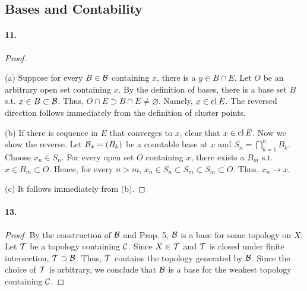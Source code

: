 \subsection{Bases and Contability}
\paragraph{11.}
\begin{proof}
  $\,$\par
  (a) Suppose for every $B\in\mathcal{B}$ containing $x$, there is a $y\in 
  B\cap E$. Let $O$ be an arbitrary open set containing $x$. By the definition
  of bases, there is a base set $B$ s.t. $x \in B \subset \mathcal{B}$. Thus,
  $O\cap E \supset B\cap E \ne \varnothing$. Namely, $x \in \operatorname{cl} E$. The
  reversed direction follows immediately from the definition of cluster points.
  
  (b) If there is sequence in $E$ that converges to $x$, clear that $x\in
  \operatorname{cl} E$. Now we show the reverse. Let $\mathcal{B}_x = (B_k)$ be a countable base
  at $x$ and $S_n = \bigcap_{k=1}^n B_k$. Choose $x_n \in S_n$. For every
  open set $O$ containing $x$, there exists a $B_m$ s.t. $x \in B_m
  \subset O$. Hence, for every $n > m$, $x_n \in S_n\subset S_m
  \subset S_m \subset O$. Thus, $x_n \to x$.
  
  (c) It follows immediately from (b).
\end{proof}

\paragraph{13.}
\begin{proof}
  By the construction of $\mathcal{B}$ and Prop. 5, $\mathcal{B}$ is a base for some
  topology on $X$. Let $\mathcal{T}$ be a topology containing $\mathcal{C}$. Since
  $X \in \mathcal{T}$ and $\mathcal{T}$ is closed under finite intersection,
  $\mathcal{T} \supset \mathcal{B}$. Thus, $\mathcal{T}$ contains the topology generated
  by $\mathcal{B}$. Since the choice of $\mathcal{T}$ is arbitrary, we conclude that
  $\mathcal{B}$ is a base for the weakest topology containing $\mathcal{C}$.
\end{proof}


